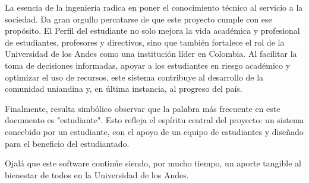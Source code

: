 La esencia de la ingeniería radica en poner el conocimiento técnico al servicio a la sociedad. Da gran orgullo percatarse de que este proyecto cumple con ese propósito. El Perfil del estudiante no solo mejora la vida académica y profesional de estudiantes, profesores y directivos, sino que también fortalece el rol de la Universidad de los Andes como una institución líder en Colombia. Al facilitar la toma de decisiones informadas, apoyar a los estudiantes en riesgo académico y optimizar el uso de recursos, este sistema contribuye al desarrollo de la comunidad uniandina y, en última instancia, al progreso del país.

Finalmente, resulta simbólico observar que la palabra más frecuente en este documento es "estudiante". Esto refleja el espíritu central del proyecto: un sistema concebido por un estudiante, con el apoyo de un equipo de estudiantes y diseñado para el beneficio del estudiantado.

Ojalá que este software continúe siendo, por mucho tiempo, un aporte tangible al bienestar de todos en la Universidad de los Andes.
